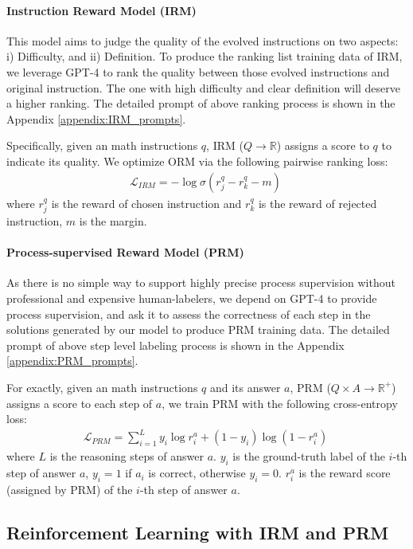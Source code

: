 \paragraph{Instruction Reward Model (IRM)} This model aims to judge the quality of the evolved instructions on two aspects: i) Difficulty, and ii) Definition. To produce the ranking list training data of IRM, we leverage GPT-4 to rank the quality between those evolved instructions and original instruction. The one with high difficulty and clear definition will deserve a higher ranking. The detailed prompt of above ranking process is shown in the Appendix \ref{appendix:IRM_prompts}. 

Specifically, given an math instructions $q$, IRM ($Q \rightarrow \mathbb{R} $) assigns a score to $q$ to indicate its quality. We optimize ORM via the following pairwise ranking loss: 
\begin{align}
\mathcal{L}_{IRM}= - \log \sigma(r^q_j - r^q_k - m)\
\label{eq:pairwise-loss}
\end{align}
where $r^q_j$ is the reward of chosen instruction and  $r^q_k$ is the reward of rejected instruction, $m$ is the margin.

\paragraph{Process-supervised Reward Model (PRM)} As there is no simple way to support highly precise process supervision without professional and expensive human-labelers, we depend on GPT-4 to provide process supervision, and ask it to assess the correctness of each step in the solutions generated by our model to produce PRM training data. The detailed prompt of above step level labeling process is shown in the Appendix \ref{appendix:PRM_prompts}. 

For exactly, given an math instructions $q$ and its answer $a$,  PRM ($Q \times A \rightarrow \mathbb{R}^{+}$) assigns a score to each step of $a$, we train PRM with the following cross-entropy loss:
\begin{align}
\mathcal{L}_{PRM}= \sum_{i=1}^{L} y_i \log r^a_i + (1 - y_i) \log(1 - r^a_i)\
\label{eq:prm-loss}
\end{align}
where $L$ is the reasoning steps of answer $a$. $y_i$ is the ground-truth label of the $i$-th step of answer $a$, $y_i = 1$ if $a_i$ is correct, otherwise $y_i = 0$. $r^a_i$ is the reward score (assigned by PRM) of the $i$-th step of answer $a$.

\subsection{Reinforcement Learning with IRM and PRM}

